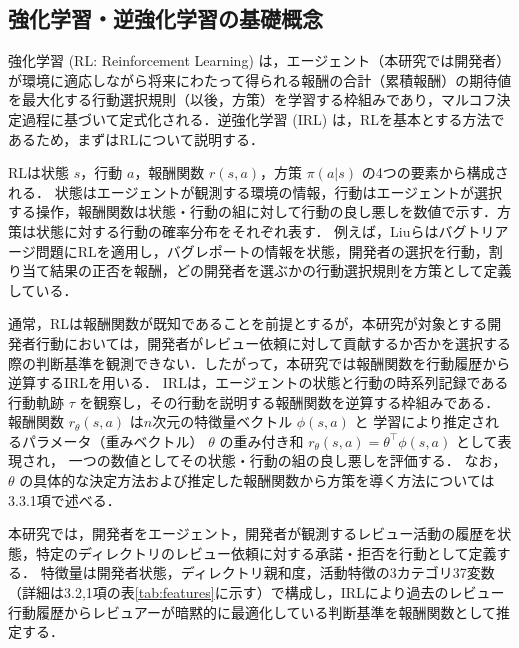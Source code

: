 \documentclass[submit,noauthor,ses,dvipdfmx]{ipsj}
\begin{document}


\subsection{強化学習・逆強化学習の基礎概念}

強化学習 (RL: Reinforcement Learning) は，エージェント（本研究では開発者）が環境に適応しながら将来にわたって得られる報酬の合計（累積報酬）の期待値を最大化する行動選択規則（以後，方策）を学習する枠組みであり，マルコフ決定過程に基づいて定式化される．逆強化学習 (IRL) は，RLを基本とする方法であるため，まずはRLについて説明する．

RLは状態 $s$，行動 $a$，報酬関数 $r(s, a)$，方策 $\pi(a|s)$ の4つの要素から構成される．
状態はエージェントが観測する環境の情報，行動はエージェントが選択する操作，報酬関数は状態・行動の組に対して行動の良し悪しを数値で示す．方策は状態に対する行動の確率分布をそれぞれ表す．
例えば，Liuらはバグトリアージ問題にRLを適用し，バグレポートの情報を状態，開発者の選択を行動，割り当て結果の正否を報酬，どの開発者を選ぶかの行動選択規則を方策として定義している\cite{RL}．

通常，RLは報酬関数が既知であることを前提とするが，本研究が対象とする開発者行動においては，開発者がレビュー依頼に対して貢献するか否かを選択する際の判断基準を観測できない．したがって，本研究では報酬関数を行動履歴から逆算するIRLを用いる．
IRLは，エージェントの状態と行動の時系列記録である行動軌跡 $\tau$ を観察し，その行動を説明する報酬関数を逆算する枠組みである．
報酬関数 $r_\theta(s,a)$ は$n$次元の特徴量ベクトル $\phi(s, a)$ と
学習により推定されるパラメータ（重みベクトル） $\theta$ の重み付き和
$r_\theta(s,a) = \theta^\top \phi(s,a)$ として表現され，
一つの数値としてその状態・行動の組の良し悪しを評価する．
なお，$\theta$ の具体的な決定方法および推定した報酬関数から方策を導く方法については3.3.1項で述べる．

本研究では，開発者をエージェント，開発者が観測するレビュー活動の履歴を状態，特定のディレクトリのレビュー依頼に対する承諾・拒否を行動として定義する．
特徴量は開発者状態，ディレクトリ親和度，活動特徴の3カテゴリ37変数（詳細は3.2,1項の表\ref{tab:features}に示す）で構成し，IRLにより過去のレビュー行動履歴からレビュアーが暗黙的に最適化している判断基準を報酬関数として推定する．
\end{document}
